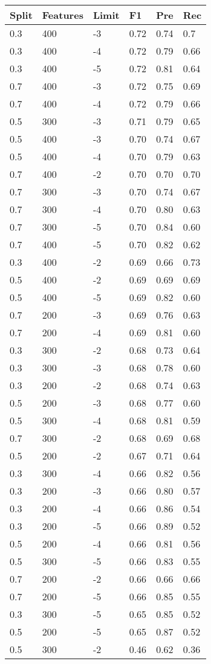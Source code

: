 \begin{tabular}{ | l | l | l | l | l | l | }
	\hline
	Split & Features & Limit & F1 & Pre & Rec \\ \hline
	0.3 & 400 & -3 & 0.72 & 0.74 & 0.7 \\ 
	0.3 & 400 & -4 & 0.72 & 0.79 & 0.66 \\
	0.3 & 400 & -5 & 0.72 & 0.81 & 0.64 \\
	0.7 & 400 & -3 & 0.72 & 0.75 & 0.69 \\
	0.7 & 400 & -4 & 0.72 & 0.79 & 0.66 \\
	0.5 & 300 & -3 & 0.71 & 0.79 & 0.65 \\
	0.5 & 400 & -3 & 0.70 & 0.74 & 0.67 \\
	0.5 & 400 & -4 & 0.70 & 0.79 & 0.63 \\ 
	0.7 & 400 & -2 & 0.70 & 0.70 & 0.70 \\ 
	0.7 & 300 & -3 & 0.70 & 0.74 & 0.67 \\
	0.7 & 300 & -4 & 0.70 & 0.80 & 0.63 \\
	0.7 & 300 & -5 & 0.70 & 0.84 & 0.60 \\
	0.7 & 400 & -5 & 0.70 & 0.82 & 0.62 \\ 
	0.3 & 400 & -2 & 0.69 & 0.66 & 0.73 \\ 
	0.5 & 400 & -2 & 0.69 & 0.69 & 0.69 \\ 
	0.5 & 400 & -5 & 0.69 & 0.82 & 0.60 \\ 
	0.7 & 200 & -3 & 0.69 & 0.76 & 0.63 \\ 
	0.7 & 200 & -4 & 0.69 & 0.81 & 0.60 \\ 
	0.3 & 300 & -2 & 0.68 & 0.73 & 0.64 \\ 
	0.3 & 300 & -3 & 0.68 & 0.78 & 0.60 \\ 
	0.3 & 200 & -2 & 0.68 & 0.74 & 0.63 \\ 
	0.5 & 200 & -3 & 0.68 & 0.77 & 0.60 \\ 
	0.5 & 300 & -4 & 0.68 & 0.81 & 0.59 \\ 
	0.7 & 300 & -2 & 0.68 & 0.69 & 0.68 \\ 
	0.5 & 200 & -2 & 0.67 & 0.71 & 0.64 \\ 
	0.3 & 300 & -4 & 0.66 & 0.82 & 0.56 \\ 
	0.3 & 200 & -3 & 0.66 & 0.80 & 0.57 \\
	0.3 & 200 & -4 & 0.66 & 0.86 & 0.54 \\
	0.3 & 200 & -5 & 0.66 & 0.89 & 0.52 \\ 
	0.5 & 200 & -4 & 0.66 & 0.81 & 0.56 \\
	0.5 & 300 & -5 & 0.66 & 0.83 & 0.55 \\ 
	0.7 & 200 & -2 & 0.66 & 0.66 & 0.66 \\ 
	0.7 & 200 & -5 & 0.66 & 0.85 & 0.55 \\ 
	0.3 & 300 & -5 & 0.65 & 0.85 & 0.52 \\ 
	0.5 & 200 & -5 & 0.65 & 0.87 & 0.52 \\
	0.5 & 300 & -2 & 0.46 & 0.62 & 0.36 \\ \hline
\end{tabular}\\

